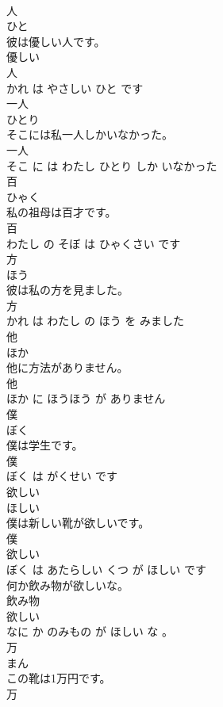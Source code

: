 \documentclass[8pt]{extreport}
\begin{document}
\begin{CJK}{UTF8}{min}
\\	人	
\\	ひと			
\\	彼は優しい人です。	
\\	優しい 
\\	人 
\\	かれ は やさしい ひと です			
\\	一人	
\\	ひとり			
\\	そこには私一人しかいなかった。	
\\	一人 
\\	そこ に は わたし ひとり しか いなかった			
\\	百	
\\	ひゃく			
\\	私の祖母は百才です。	
\\	百 
\\	わたし の そぼ は ひゃくさい です			
\\	方	
\\	ほう			
\\	彼は私の方を見ました。	
\\	方 
\\	かれ は わたし の ほう を みました			
\\	他	
\\	ほか			
\\	他に方法がありません。	
\\	他 
\\	ほか に ほうほう が ありません			
\\	僕	
\\	ぼく			
\\	僕は学生です。	
\\	僕 
\\	ぼく は がくせい です			
\\	欲しい	
\\	ほしい			
\\	僕は新しい靴が欲しいです。	
\\	僕 
\\	欲しい 
\\	ぼく は あたらしい くつ が ほしい です			
\\	何か飲み物が欲しいな。	
\\	飲み物 
\\	欲しい 
\\	なに か のみもの が ほしい な 。			
\\	万	
\\	まん			
\\	この靴は1万円です。	
\\	万 

\end{CJK}
\end{document}
